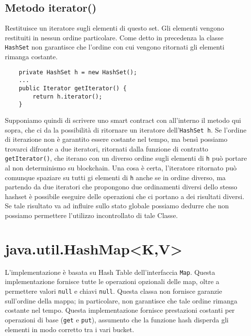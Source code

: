 		\subsection{Metodo iterator()}
			Restituisce un iteratore sugli elementi di questo set. Gli elementi vengono restituiti in nessun ordine particolare. Come detto in precedenza la classe \lstinline|HashSet| non garantisce che l'ordine con cui vengono ritornati gli elementi rimanga costante.
			\begin{lstlisting}
	private HashSet h = new HashSet(); 
	...
	public Iterator getIterator() { 
		return h.iterator();
	}
			\end{lstlisting}
			Supponiamo quindi di scrivere uno smart contract con all'interno il metodo qui sopra, che ci da la possibilità di ritornare un iteratore dell'\lstinline|HashSet h|. Se l'ordine di iterazione non è garantito essere costante nel tempo, ma bensì possiamo trovarci difronte a due iteratori, ritornati dalla funzione di contratto \lstinline|getIterator()|, che iterano con un diverso ordine sugli elementi di \lstinline|h| può portare al non determinismo su blockchain. Una cosa è certa, l'iteratore ritornato può comunque spaziare su tutti gi elementi di \lstinline|h| anche se in ordine diverso, ma partendo da due iteratori che propongono due ordinamenti diversi dello stesso hashset è possibile eseguire delle operazioni che ci portano a dei risultati diversi. Se tale risultato va ad influire sullo stato globale possiamo dedurre che non possiamo permettere l'utilizzo incontrollato di tale Classe.
					
	\section{java.util.HashMap<K,V>}
		L'implementazione è basata su Hash Table dell'interfaccia \lstinline|Map|. Questa implementazione fornisce tutte le operazioni opzionali delle map, oltre a permettere valori \lstinline|null| e chiavi \lstinline|null|. Questa classa non fornisce garanzie sull'ordine della mappa; in particolare, non garantisce che tale ordine rimanga costante nel tempo. Questa implementazione fornisce prestazioni costanti per operazioni di base (\lstinline|get| e \lstinline|put|), assumento che la funzione hash disperda gli elementi in modo corretto tra i vari bucket.
			
